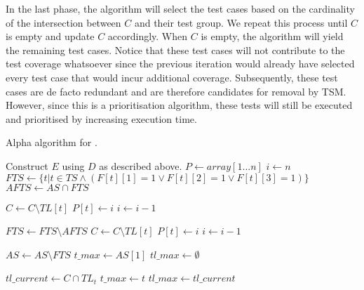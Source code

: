 \noindent In the last phase, the algorithm will select the test cases based on the cardinality of the intersection between $C$ and their test group. We repeat this process until $C$ is empty and update $C$ accordingly. When $C$ is empty, the algorithm will yield the remaining test cases. Notice that these test cases will not contribute to the test coverage whatsoever since the previous iteration would already have selected every test case that would incur additional coverage. Subsequently, these test cases are de facto redundant and are therefore candidates for removal by TSM. However, since this is a prioritisation algorithm, these tests will still be executed and prioritised by increasing execution time.

\begin{algorithm}[htbp!]
\caption{Alpha algorithm for \tcp{}.}
\label{alg:alpha}
\begin{algorithmic}[1]
	
	
		\State Construct $E$ using $D$ as described above.
		\State $P \gets array[1 \dots n]$ 
		\State $i \gets n$
		\State $FTS \gets \{t \vert t \in TS \wedge (F[t][1] = 1 \vee F[t][2] = 1 \vee F[t][3] = 1)\}$
		\State $AFTS \gets AS \cap FTS$
		
		 
			\State $C \gets C \setminus TL[t]$
			\State $P[t] \gets i$
			\State $i \gets i - 1$
		\EndFor
		
		\State $FTS \gets FTS \setminus AFTS$
		 
			\State $C \gets C \setminus TL[t]$
			\State $P[t] \gets i$
			\State $i \gets i - 1$
		\EndFor
		
		\State $AS \gets AS \setminus FTS$
			\State $t\_max \gets AS[1]$ 
			\State $tl\_max \gets \emptyset$
			
				\State $tl\_current \gets C \cap TL_{t}$
					\State $t\_max \gets t$
					\State $tl\_max \gets tl\_current$
				\EndIf
			\EndFor
			

\end{algorithmic}
\end{algorithm}
